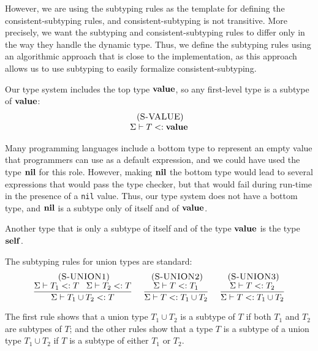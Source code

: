 However, we are using the subtyping rules as the template for defining
the consistent-subtyping rules, and consistent-subtyping is not
transitive.
More precisely, we want the subtyping and consistent-subtyping rules
to differ only in the way they handle the dynamic type.
Thus, we define the subtyping rules using an algorithmic approach
that is close to the implementation, as this approach allows us to use
subtyping to easily formalize consistent-subtyping.

Our type system includes the top type $\mathbf{value}$,
so any first-level type is a subtype of $\mathbf{value}$:
\[
\begin{array}{c}
\; (\textsc{S-VALUE})\\
\Sigma \vdash T <: \mathbf{value}
\end{array}
\]

Many programming languages include a bottom type to represent
an empty value that programmers can use as a default expression,
and we could have used the type $\mathbf{nil}$ for this role.
However, making $\mathbf{nil}$ the bottom type would lead to several expressions
that would pass the type checker, but that would fail during run-time
in the presence of a \texttt{nil} value.
Thus, our type system does not have a bottom type, and $\mathbf{nil}$ is a
subtype only of itself and of $\mathbf{value}$.

Another type that is only a subtype of itself and of the type $\mathbf{value}$
is the type $\mathbf{self}$.

The subtyping rules for union types are standard:
\[
\begin{array}{c}
\begin{array}{c}
\; (\textsc{S-UNION1})\\
\dfrac{\Sigma \vdash T_{1} <: T \;\;\;
       \Sigma \vdash T_{2} <: T}
      {\Sigma \vdash T_{1} \cup T_{2} <: T}
\end{array}
\;
\begin{array}{c}
\; (\textsc{S-UNION2})\\
\dfrac{\Sigma \vdash T <: T_{1}}
      {\Sigma \vdash T <: T_{1} \cup T_{2}}
\end{array}
\;
\begin{array}{c}
\; (\textsc{S-UNION3})\\
\dfrac{\Sigma \vdash T <: T_{2}}
      {\Sigma \vdash T <: T_{1} \cup T_{2}}
\end{array}
\end{array}
\]

The first rule shows that a union type $T_{1} \cup T_{2}$
is a subtype of $T$ if both $T_{1}$ and $T_{2}$ are subtypes
of $T$;
and the other rules show that a type $T$ is a subtype
of a union type $T_{1} \cup T_{2}$ if $T$ is a subtype of
either $T_{1}$ or $T_{2}$.

